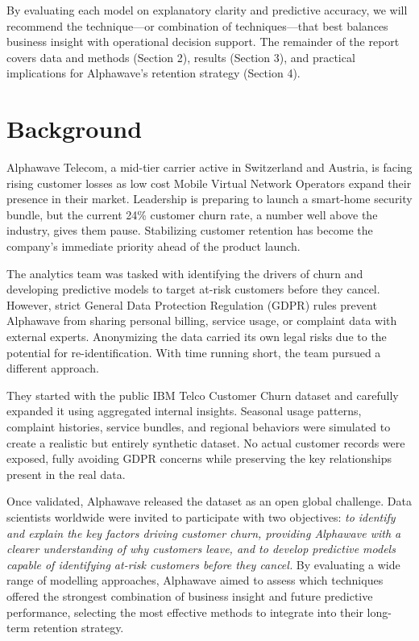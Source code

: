 \documentclass[
]{article}
\begin{document}
By evaluating each model on explanatory clarity and predictive accuracy,
we will recommend the technique---or combination of techniques---that
best balances business insight with operational decision support. The
remainder of the report covers data and methods (Section 2), results
(Section 3), and practical implications for Alphawave's retention
strategy (Section 4).

\hypertarget{background}{%
\section{Background}\label{background}}

Alphawave Telecom, a mid-tier carrier active in Switzerland and Austria,
is facing rising customer losses as low cost Mobile Virtual Network
Operators expand their presence in their market. Leadership is preparing
to launch a smart-home security bundle, but the current 24\% customer
churn rate, a number well above the industry, gives them pause.
Stabilizing customer retention has become the company's immediate
priority ahead of the product launch.

The analytics team was tasked with identifying the drivers of churn and
developing predictive models to target at-risk customers before they
cancel. However, strict General Data Protection Regulation (GDPR) rules
prevent Alphawave from sharing personal billing, service usage, or
complaint data with external experts. Anonymizing the data carried its
own legal risks due to the potential for re-identification. With time
running short, the team pursued a different approach.

They started with the public IBM Telco Customer Churn dataset and
carefully expanded it using aggregated internal insights. Seasonal usage
patterns, complaint histories, service bundles, and regional behaviors
were simulated to create a realistic but entirely synthetic dataset. No
actual customer records were exposed, fully avoiding GDPR concerns while
preserving the key relationships present in the real data.

Once validated, Alphawave released the dataset as an open global
challenge. Data scientists worldwide were invited to participate with
two objectives: \emph{to identify and explain the key factors driving
customer churn, providing Alphawave with a clearer understanding of why
customers leave, and to develop predictive models capable of identifying
at-risk customers before they cancel.} By evaluating a wide range of
modelling approaches, Alphawave aimed to assess which techniques offered
the strongest combination of business insight and future predictive
performance, selecting the most effective methods to integrate into
their long-term retention strategy.
\end{document}
